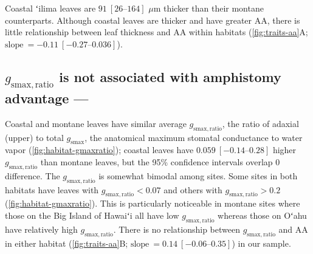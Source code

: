 \documentclass[
  letterpaper,
  DIV=11,
  numbers=noendperiod]{scrartcl}
\begin{document}
Coastal ʻilima leaves are \(91~[\numrange{26}{164}]\) \(\mu\text{m}\)
thicker than their montane counterparts. Although coastal leaves are
thicker and have greater \(\mathrm{AA}\), there is little relationship
between leaf thickness and \(\mathrm{AA}\) within habitats
(\autoref{fig:traits-aa}A;
\(\text{slope}~= -0.11~[\numrange{-0.27}{0.036}]\)).

\hypertarget{g_mathrmsmaxratio-is-not-associated-with-amphistomy-advantage}{%
\subsection{\texorpdfstring{\(g_\mathrm{smax,ratio}\) is not associated
with amphistomy advantage
---}{g\_\textbackslash mathrm\{smax,ratio\} is not associated with amphistomy advantage ---}}\label{g_mathrmsmaxratio-is-not-associated-with-amphistomy-advantage}}

Coastal and montane leaves have similar average
\(g_\mathrm{smax,ratio}\), the ratio of adaxial (upper) to total
\(g_\mathrm{smax}\), the anatomical maximum stomatal conductance to
water vapor (\autoref{fig:habitat-gmaxratio}); coastal leaves have
\(0.059~[\numrange{-0.14}{0.28}]\) higher \(g_\mathrm{smax,ratio}\) than
montane leaves, but the 95\% confidence intervals overlap 0 difference.
The \(g_\mathrm{smax,ratio}\) is somewhat bimodal among sites. Some
sites in both habitats have leaves with \(g_\mathrm{smax,ratio} < 0.07\)
and others with \(g_\mathrm{smax,ratio} > 0.2\)
(\autoref{fig:habitat-gmaxratio}). This is particularly noticeable in
montane sites where those on the Big Island of Hawaiʻi all have low
\(g_\mathrm{smax,ratio}\) whereas those on Oʻahu have relatively high
\(g_\mathrm{smax,ratio}\). There is no relationship between
\(g_\mathrm{smax,ratio}\) and \(\mathrm{AA}\) in either habitat
(\autoref{fig:traits-aa}B;
\(\text{slope}~= 0.14~[\numrange{-0.06}{0.35}]\)) in our sample.
\end{document}
